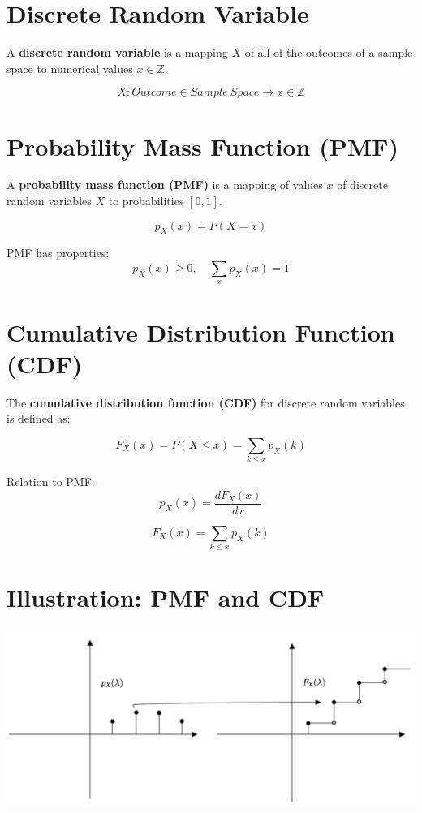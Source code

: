 \documentclass[
  letterpaper,
  DIV=11,
  numbers=noendperiod]{scrreprt}
\begin{document}
\section{Discrete Random Variable}\label{discrete-random-variable}

A \textbf{discrete random variable} is a mapping \(X\) of all of the
outcomes of a sample space to numerical values \(x \in \mathbb{Z}\).

\[
X: Outcome \in Sample \ Space \to x \in \mathbb{Z}
\]

\section{Probability Mass Function
(PMF)}\label{probability-mass-function-pmf}

A \textbf{probability mass function (PMF)} is a mapping of values \(x\)
of discrete random variables \(X\) to probabilities \([0,1]\).

\[
p_{X}(x) = P(X = x)
\]

PMF has properties: \[
p_{X}(x) \geq 0, \quad \sum_{x} p_{X}(x) = 1
\]

\section{Cumulative Distribution Function
(CDF)}\label{cumulative-distribution-function-cdf}

The \textbf{cumulative distribution function (CDF)} for discrete random
variables is defined as:

\[
F_{X}(x) = P(X \leq x) = \sum_{k \leq x} p_{X}(k)
\]

Relation to PMF: \[
p_{X}(x) = \frac{dF_{X}(x)}{dx}
\]

\[
F_{X}(x) = \sum_{k \leq x}p_{X}(k)
\]

\section{Illustration: PMF and CDF}\label{illustration-pmf-and-cdf}

\includegraphics[width=0.75\linewidth,height=\textheight,keepaspectratio]{lecture2/images/pdf-cdf.png}
\end{document}
